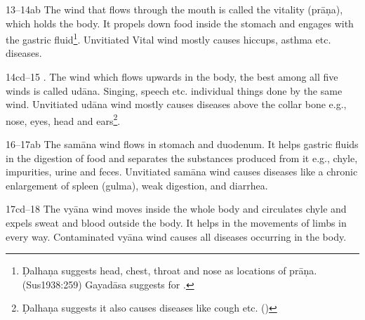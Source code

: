 \begin{translation}
                            \item[13--14ab] The wind that flows through the mouth is 
                            called the 
                            vitality
                            (prāṇa), which holds the body. It propels down food inside the 
                            stomach
                            and engages with the gastric fluid\footnote{ Ḍalhaṇa suggests 
                            head,
                                chest, throat and nose as locations of prāṇa. (Sus1938:259) 
                                Gayadāsa
                                suggests  for .}. Unvitiated Vital wind 
                                mostly 
                                causes hiccups,
                                asthma etc. diseases.
                                
                                \item[14cd--15]. The wind which flows upwards in the body, 
                                the best among all
                                five winds is called udāna. Singing, speech etc. individual 
                                things done
                                by the same wind. Unvitiated udāna wind mostly causes 
                                diseases above the
                                collar bone e.g., nose, eyes, head and ears\footnote{ 
                                Ḍalhaṇa suggests
                                    it also causes diseases like cough etc. 
                                    ()}.
                                    
                                    \item [16--17ab] The samāna wind flows in stomach and 
                                    duodenum. It helps
                                    gastric fluids in the digestion of food and separates the 
                                    substances
                                    produced from it e.g., chyle, impurities, urine and feces. 
                                    Unvitiated
                                    samāna wind causes diseases like a chronic enlargement 
                                    of spleen
                                    (gulma), weak digestion, and diarrhea.
                                    
                                    \item[17cd--18] The vyāna wind moves inside the whole 
                                    body 
                                    and circulates
                                    chyle and expels sweat and blood outside the body. It 
                                    helps in the
                                    movements of limbs in every way. Contaminated vyāna 
                                    wind causes all
                                    diseases occurring in the body.
                                    

\end{translation}
